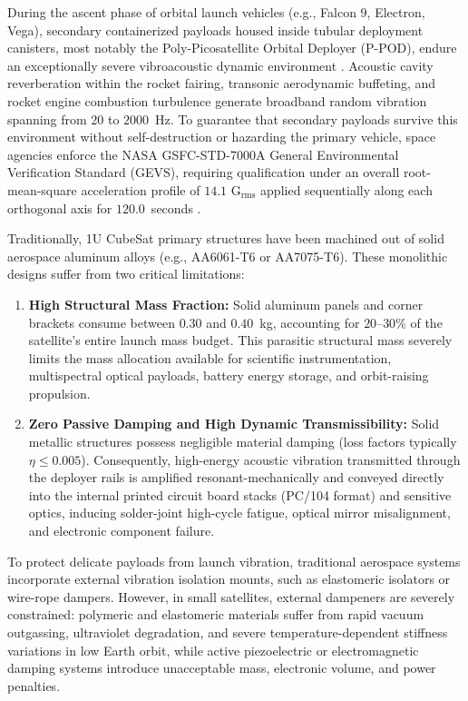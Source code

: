 \documentclass[preprint,12pt,3p]{elsarticle}
\begin{document}
During the ascent phase of orbital launch vehicles (e.g., Falcon 9, Electron, Vega), secondary containerized payloads housed inside tubular deployment canisters, most notably the Poly-Picosatellite Orbital Deployer (P-POD), endure an exceptionally severe vibroacoustic dynamic environment \cite{nasa2013,puigsuari2002}. Acoustic cavity reverberation within the rocket fairing, transonic aerodynamic buffeting, and rocket engine combustion turbulence generate broadband random vibration spanning from $20$ to $2000$~Hz. To guarantee that secondary payloads survive this environment without self-destruction or hazarding the primary vehicle, space agencies enforce the NASA GSFC-STD-7000A General Environmental Verification Standard (GEVS), requiring qualification under an overall root-mean-square acceleration profile of $14.1\text{ G}_{\text{rms}}$ applied sequentially along each orthogonal axis for $120.0$~seconds \cite{nasa2013}.

Traditionally, 1U CubeSat primary structures have been machined out of solid aerospace aluminum alloys (e.g., AA6061-T6 or AA7075-T6). These monolithic designs suffer from two critical limitations:
\begin{enumerate}
  \item \textbf{High Structural Mass Fraction:} Solid aluminum panels and corner brackets consume between $0.30$ and $0.40$~kg, accounting for $20\text{--}30\%$ of the satellite's entire launch mass budget. This parasitic structural mass severely limits the mass allocation available for scientific instrumentation, multispectral optical payloads, battery energy storage, and orbit-raising propulsion.
  \item \textbf{Zero Passive Damping and High Dynamic Transmissibility:} Solid metallic structures possess negligible material damping (loss factors typically $\eta \le 0.005$). Consequently, high-energy acoustic vibration transmitted through the deployer rails is amplified resonant-mechanically and conveyed directly into the internal printed circuit board stacks (PC/104 format) and sensitive optics, inducing solder-joint high-cycle fatigue, optical mirror misalignment, and electronic component failure.
\end{enumerate}

To protect delicate payloads from launch vibration, traditional aerospace systems incorporate external vibration isolation mounts, such as elastomeric isolators or wire-rope dampers. However, in small satellites, external dampeners are severely constrained: polymeric and elastomeric materials suffer from rapid vacuum outgassing, ultraviolet degradation, and severe temperature-dependent stiffness variations in low Earth orbit, while active piezoelectric or electromagnetic damping systems introduce unacceptable mass, electronic volume, and power penalties.
\end{document}
